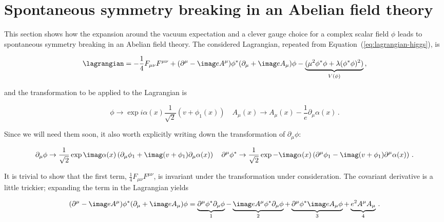 \clearpage
\section{Spontaneous symmetry breaking in an Abelian field theory}
\label{app:theory}

This section shows how the expansion around the vacuum expectation and a clever gauge choice for a complex scalar field $\phi$ leads to spontaneous symmetry breaking in an Abelian field theory.
% 
The considered Lagrangian, repeated from Equation~(\ref{eq:lagrangian-higgs}), is
% 
\begin{linenomath*}
\begin{equation}
\label{eq:lagrangian-higgs-copy}
\lagrangian =
    -\frac{1}{4} F_{\mu\nu} F^{\mu\nu}
    + (\partial^\mu - \imag e A^\mu) \phi^\ast (\partial_\mu + \imag e A_\mu) \phi
    - \underbrace{(\mu^2 \phi^\ast \phi + \lambda (\phi^\ast \phi)^2)}_{V(\phi)}
\,,
\end{equation}
\end{linenomath*}
% 
and the transformation to be applied to the Lagrangian is
% 
\begin{linenomath*}
\begin{equation}
\label{eq:transformation-higgs-copy}
\phi \to \exp{i\alpha(x)} \frac{1}{\sqrt{2}} \left( v + \phi_1(x) \right)
\quad
A_\mu(x) \to A_\mu(x) - \frac{1}{e} \partial_\mu \alpha(x)
\,.
\end{equation}
\end{linenomath*}
% 
Since we will need them soon, it also worth explicitly writing down the transformation of $\partial_\mu \phi$:
% 
\begin{linenomath*}
\begin{equation}
\partial_\mu \phi \to
    \frac{1}{\sqrt{2}} \exp{\imag \alpha(x)} \left(
    \partial_\mu \phi_1 + \imag (v+\phi_1) \partial_\mu \alpha(x)
    \right)
\quad
\partial^\mu \phi^\ast \to
    \frac{1}{\sqrt{2}} \exp{-\imag \alpha(x)} \left(
    \partial^\mu \phi_1 - \imag (v+\phi_1) \partial^\mu \alpha(x)
    \right)
\,.
\end{equation}
\end{linenomath*}
% 
It is trivial to show that the first term, $\frac{1}{4} F_{\mu\nu} F^{\mu\nu}$, is invariant under the transformation under consideration.
% 
The covariant derivative is a little trickier; expanding the term in the Lagrangian yields
% 
\begin{linenomath*}
\begin{equation}
\label{eq:covariant-derivative}
(\partial^\mu - \imag e A^\mu) \phi^\ast (\partial_\mu + \imag e A_\mu) \phi
=
\underbrace{\partial^\mu \phi^\ast \partial_\mu \phi}_1
- \underbrace{\imag e A^\mu \phi^\ast \partial_\mu \phi}_2
+ \underbrace{\partial^\mu \phi^\ast \imag e A_\mu \phi}_3
+ \underbrace{e^2 A^\mu A_\mu}_4
\,.
\end{equation}
\end{linenomath*}
